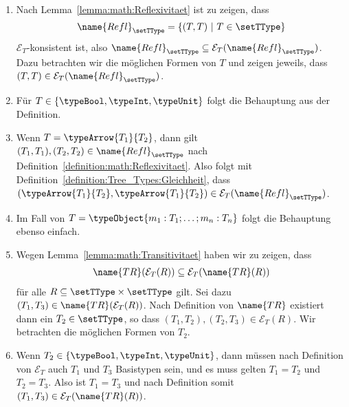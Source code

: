 \begin{beweis} \
  \begin{enumerate}
    \item Nach Lemma~\ref{lemma:math:Reflexivitaet} ist zu zeigen, dass
          \[\begin{array}{l}
            \name{Refl}_{\setTType} = \{(T,T)\ |\ T\in\setTType\}
          \end{array}\]
          $\mathcal{E}_T$-konsistent ist, also
          $\name{Refl}_{\setTType} \subseteq \mathcal{E}_T(\name{Refl}_{\setTType})$.
          Dazu betrachten wir die m\"oglichen Formen von $T$ und zeigen jeweils, dass
          $(T,T) \in \mathcal{E}_T(\name{Refl}_{\setTType})$.
          \PROOFCASEbeg
            \item F\"ur $T \in \{\typeBool,\typeInt,\typeUnit\}$ folgt die Behauptung aus der Definition.

            \item Wenn $T = \typeArrow{T_1}{T_2}$, dann gilt $(T_1,T_1),(T_2,T_2)\in\name{Refl}_{\setTType}$
                  nach Definition~\ref{definition:math:Reflexivitaet}. Also folgt mit
                  Definition~\ref{definition:Tree_Types:Gleichheit}, dass
                  $(\typeArrow{T_1}{T_2},\typeArrow{T_1}{T_2})\in \mathcal{E}_T(\name{Refl}_{\setTType})$.

            \item Im Fall von $T = \typeObject{m_1:T_1;\ldots;m_n:T_n}$ folgt die Behauptung ebenso einfach.
          \PROOFCASEend

    \item Wegen Lemma~\ref{lemma:math:Transitivitaet} haben wir zu zeigen, dass
          \[\begin{array}{l}
            \name{TR}(\mathcal{E}_T(R)) \subseteq \mathcal{E}_T(\name{TR}(R))
          \end{array}\]
          f\"ur alle $R \subseteq \setTType \times \setTType$ gilt.
          Sei dazu $(T_1,T_3)\in\name{TR}(\mathcal{E}_T(R))$. Nach Definition von $\name{TR}$ existiert
          dann ein $T_2\in\setTType$, so dass $(T_1,T_2),(T_2,T_3)\in\mathcal{E}_T(R)$. Wir betrachten die
          m\"oglichen Formen von $T_2$.
          \PROOFCASEbeg
            \item Wenn $T_2\in\{\typeBool,\typeInt,\typeUnit\}$, dann m\"ussen nach Definition von
                  $\mathcal{E}_T$ auch $T_1$ und $T_3$ Basistypen sein, und es muss gelten $T_1 = T_2$
                  und $T_2 = T_3$. Also ist $T_1 = T_3$ und nach Definition somit
                  $(T_1,T_3)\in\mathcal{E}_T(\name{TR}(R))$.


\end{enumerate}
\end{beweis}

